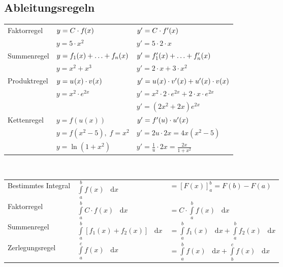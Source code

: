 \documentclass[
	final,
	a4paper,
	oneside,
	parskip=full,
	headings=standardclasses,
	headings=big,
	pointednumbers,
    fleqn
]{scrartcl}
\newcommand*\difx{\; \mathop{}\!\mathrm{d}x}
\newcommand{\kl}[1]{{\left( #1 \right)}}
\newcommand{\ks}[1]{{\left[ #1 \right]}}
\begin{document}
    \subsection*{Ableitungsregeln}
    
    \renewcommand{\arraystretch}{1.25}
    \begin{tabular}{lll}
        Faktorregel  & $ y = C \cdot \fx$                   & $ y' = C \cdot \dfx $ \\
                     & $ y = 5 \cdot x^2 $                  & $ y' = 5 \cdot 2 \cdot x$ \\
        Summenregel  & $ y = \fx[1] + \ldots +  \fx[n] $    & $ y' = \dfx[1] + \ldots + \dfx[n] $\\
                     & $ y = x^2 + x^3$                     & $ y' = 2 \cdot x + 3 \cdot x^2$ \\
        Produktregel & $ y = \fx[][u] \cdot \fx[][v] $      & $ y' = \fx[][u] \cdot \dfx[][v] + \dfx[][u] \cdot \fx[][v] $ \\
                     & $ y = x^2 \cdot e^{2x}  $            & $ y' = x^2 \cdot 2\cdot e^{2x} + 2\cdot x \cdot e^{2x} $ \\
                     &                                      & $ y' = {\left( 2x^2 + 2x \right)} e^{2x} $ \\
        Kettenregel  & $ y = f\kl{u\kl{x}} $                & $ y' = \dfx[][f][u] \cdot \dfx[][u][x] $ \\
                     & $ y = f\kl{x^2 - 5}, \; f = x^2 $    & $ y' = 2 u \cdot 2x = 4x \kl{x^2 - 5} $ \\
                     & $ y = \ln\kl{1 + x^2} $              & $ y' = \frac{1}{u} \cdot 2x = \frac{2x}{1 + x^2} $ \\
    \end{tabular} \\

    \renewcommand{\arraystretch}{1.25}
    \begin{tabular}{lll}
        Bestimmtes Integral & $ \int\limits_{a}^{b}{f\kl{x} \difx} $                      & $ = \ks{F\kl{x}}_{a}^{b} = F\kl{b} - F\kl{a} $ \\
        Faktorregel         & $ \int\limits_{a}^{b}{C \cdot f\kl{x} \difx} $              & $ = C \cdot \int\limits_{a}^{b}{f\kl{x} \difx} $     \\
        Summenregel         & $ \int\limits_{a}^{b}{\ks{f_1\kl{x} + f_2\kl{x}} \difx} $   & $ = \int\limits_{a}^{b}{f_1\kl{x} \difx} + \int\limits_{a}^{b}{f_2\kl{x} \difx} $      \\
        Zerlegungsregel     & $ \int\limits_{a}^{c}{f\kl{x} \difx} $                      & $ = \int\limits_{a}^{b}{f\kl{x} \difx} + \int\limits_{b}^{c}{f\kl{x} \difx}$  \\
    \end{tabular} \\
\end{document}
